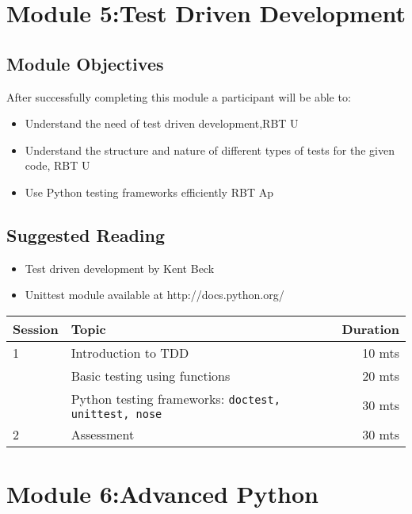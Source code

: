 \documentclass{article}
\begin{document}
\section{Module 5:Test Driven Development}
\label{tdd}
\subsection{Module Objectives}
After successfully completing this module a participant will be able to:
        \begin{itemize}
            \item Understand the need of test driven development,\hfill RBT U
            \item Understand the structure and nature of different types of tests for the given code, \hfill RBT U
            \item Use Python testing frameworks efficiently  \hfill RBT Ap
        \end{itemize}
\subsection{Suggested Reading}
\begin{itemize}
    \item Test driven development by Kent Beck
    \item Unittest module available at http://docs.python.org/
\end{itemize}

\begin{tabular}{llr}
\hline
Session & Topic & Duration\\\hline
1 & Introduction to TDD                                        & 10 mts\\
  & Basic testing using functions                              & 20 mts\\
  & Python testing frameworks: \tt{doctest, unittest, nose}    & 30 mts\\\hline

2 & Assessment                                                 & 30 mts\\\hline\hline
\end{tabular}

\section{Module 6:Advanced Python}
\label{AP}
\end{document}
